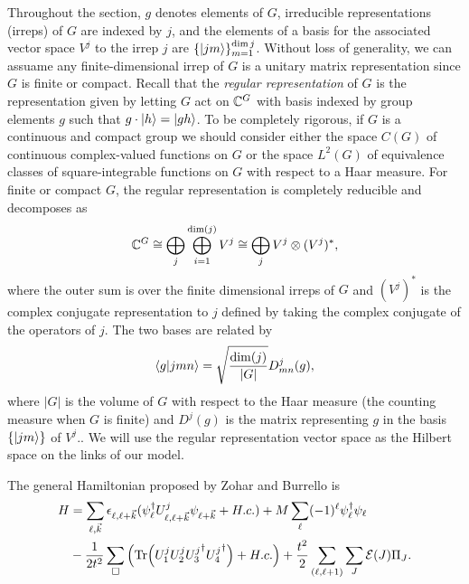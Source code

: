 \documentclass[11pt,reqno]{amsart}
\numberwithin{equation}{section}
\begin{document}
	Throughout the section, $g$ denotes elements of $G$, irreducible representations (irreps) of $G$ are indexed by $j$, and the elements of a basis for the associated vector space $V^j$ to the irrep $j$ are $\{\ket{jm} \}_{m=1}^{\dim j}$.
	Without loss of generality, we can assuame any finite-dimensional irrep of $G$ is a unitary matrix representation since $G$ is finite or compact.
	Recall that the \emph{regular representation} of $G$ is the representation given by letting $G$ act on $\mathbb{C}^{G}$ with basis indexed by group elements $g$ such that $g\cdot \ket{h} = \ket{gh}$. 
	To be completely rigorous, if $G$ is a continuous and compact group we should consider either the space $C(G)$ of continuous complex-valued functions on $G$ or the space $L^2(G)$ of equivalence classes of square-integrable functions on $G$ with respect to a Haar measure.
	For finite or compact $G$, the regular representation is completely reducible and decomposes as
	\begin{equation}\label{eq:reg_rep_decomp}
		\mathbb{C}^{G}\cong\bigoplus_j \bigoplus_{i=1}^{\dim (j)} V^j \cong \bigoplus_j V^j \otimes (V^j)^* ,
	\end{equation}
	where the outer sum is over the finite dimensional irreps of $G$ and $(V^j)^*$ is the complex conjugate representation to $j$ defined by taking the complex conjugate of the operators of $j$.
	The two bases are related by
	\begin{equation}\label{eq:group_rep_basis_relation}
		\braket{g}{jmn}=\sqrt{\frac{\dim(j)}{|G|}}D^j_{mn}(g),
	\end{equation}
	where $|G|$ is the volume of $G$ with respect to the Haar measure (the counting measure when $G$ is finite) and $D^j(g)$ is the matrix representing $g$ in the basis $\{\ket{jm}\}$ of $V^j$..
	We will use the regular representation vector space as the Hilbert space on the links of our model.
	
	The general Hamiltonian proposed by Zohar and Burrello is
	\begin{align}\label{eq:zohar_hamiltonian}
	H&=\sum_{\ell,\vec{k}} \epsilon_{\ell,\ell+\vec{k}}(\psi_\ell^\dagger U_{\ell,\ell+\vec{k}}^j\psi_{\ell+\vec{k}}+H.c.) + M\sum_\ell (-1)^\ell \psi_\ell^\dagger\psi_\ell \nonumber\\ 
	&- \frac{1}{2t^2} \sum_{\Box} \left(\Tr(U_1^j U_2^j {U_3^j}^\dagger {U_4^j}^\dagger) + H.c.\right) + \frac{t^2}{2} \sum_{(\ell,\ell+1)} \sum_{J} \mathcal{E}(J)\Pi_J.
	\end{align}
	
\end{document}
